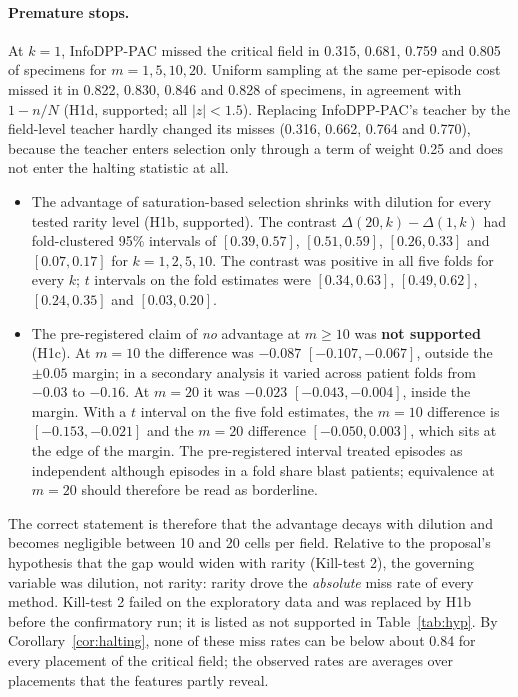 \documentclass[11pt]{article}
\theoremstyle{remark}
\theoremstyle{definition}
\begin{document}
\paragraph{Premature stops.} At $k=1$, InfoDPP-PAC missed the critical field in 0.315, 0.681, 0.759 and 0.805 of specimens for $m=1,5,10,20$. Uniform sampling at the same per-episode cost missed it in 0.822, 0.830, 0.846 and 0.828 of specimens, in agreement with $1-n/N$ (H1d, supported; all $|z|<1.5$). Replacing InfoDPP-PAC's teacher by the field-level teacher hardly changed its misses (0.316, 0.662, 0.764 and 0.770), because the teacher enters selection only through a term of weight 0.25 and does not enter the halting statistic at all.
\begin{itemize}
\item The advantage of saturation-based selection shrinks with dilution for every tested rarity level (H1b, supported). The contrast $\Delta(20,k)-\Delta(1,k)$ had fold-clustered 95\% intervals of $[0.39,0.57]$, $[0.51,0.59]$, $[0.26,0.33]$ and $[0.07,0.17]$ for $k=1,2,5,10$. The contrast was positive in all five folds for every $k$; $t$ intervals on the fold estimates were $[0.34,0.63]$, $[0.49,0.62]$, $[0.24,0.35]$ and $[0.03,0.20]$.
\item The pre-registered claim of \emph{no} advantage at $m\ge10$ was \textbf{not supported} (H1c). At $m=10$ the difference was $-0.087$ $[-0.107,-0.067]$, outside the $\pm0.05$ margin; in a secondary analysis it varied across patient folds from $-0.03$ to $-0.16$. At $m=20$ it was $-0.023$ $[-0.043,-0.004]$, inside the margin. With a $t$ interval on the five fold estimates, the $m=10$ difference is $[-0.153,-0.021]$ and the $m=20$ difference $[-0.050,0.003]$, which sits at the edge of the margin. The pre-registered interval treated episodes as independent although episodes in a fold share blast patients; equivalence at $m=20$ should therefore be read as borderline.
\end{itemize}
The correct statement is therefore that the advantage decays with dilution and becomes negligible between 10 and 20 cells per field. Relative to the proposal's hypothesis that the gap would widen with rarity (Kill-test 2), the governing variable was dilution, not rarity: rarity drove the \emph{absolute} miss rate of every method. Kill-test 2 failed on the exploratory data and was replaced by H1b before the confirmatory run; it is listed as not supported in Table~\ref{tab:hyp}. By Corollary~\ref{cor:halting}, none of these miss rates can be below about 0.84 for every placement of the critical field; the observed rates are averages over placements that the features partly reveal.
\end{document}
